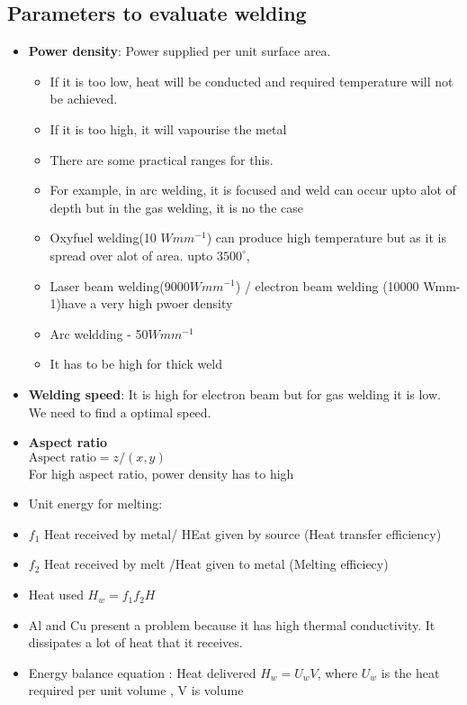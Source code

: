 \documentclass{article}
\begin{document}

	\subsection{Parameters to evaluate welding}
		\begin{itemize}
			\item \textbf{Power density}: Power supplied per unit surface area.
				\begin{itemize}
					\item If it is too low, heat will be conducted and required temperature will not be achieved.
					\item If it is too high, it will vapourise the metal
					\item There are some practical ranges for this. 
					\item For example, in arc welding, it is focused and weld can occur upto alot of depth but in the gas welding, it is no the case
					\item Oxyfuel welding(10 $Wmm^{-1}$) can produce high temperature  but as it is spread over alot of area. upto $3500^\circ$,
					\item Laser beam welding(9000$Wmm^{-1}$) / electron beam welding (10000 Wmm-1)have a very high pwoer density
					\item Arc weldding - 50$Wmm^{-1}$
					\item It has to be high for thick weld
				\end{itemize}
			\item \textbf{Welding speed}: It is high for electron beam but for gas welding it is low. We need to find a optimal speed.

			\item \textbf{Aspect ratio}\\
				$\text{Aspect ratio} = z/(x,y)$\\
				For high aspect ratio, power density has to high

			\item Unit energy for melting:
				\item $f_1$ 	Heat received by metal/ HEat given by source (Heat transfer efficiency)
				\item $f_2$ Heat received by melt /Heat given to metal (Melting efficiecy)
				\item Heat used $ H_w = f_1 f_2 H $
				\item Al and Cu present a problem because it has high thermal conductivity. It dissipates a lot of heat that it receives.
				\item Energy balance equation : Heat delivered $H_w = U_w V$, where $U_w$ is the heat required per unit volume , V is volume


\end{itemize}
\end{document}
